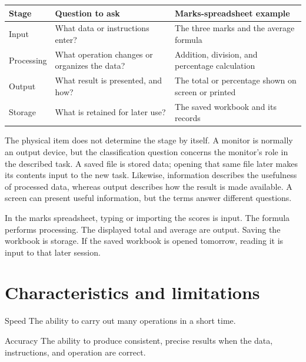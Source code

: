 \begin{center}
\begin{tabular}{p{}p{}p{}}
\toprule
\textbf{Stage} & \textbf{Question to ask} & \textbf{Marks-spreadsheet example}\\
\midrule
Input & What data or instructions enter? & The three marks and the average formula\\
Processing & What operation changes or organizes the data? & Addition, division, and percentage calculation\\
Output & What result is presented, and how? & The total or percentage shown on screen or printed\\
Storage & What is retained for later use? & The saved workbook and its records\\
\bottomrule
\end{tabular}
\end{center}

The physical item does not determine the stage by itself. A monitor is
normally an output device, but the classification question concerns the
monitor's role in the described task. A saved file is stored data; opening
that same file later makes its contents input to the new task. Likewise,
information describes the usefulness of processed data, whereas output
describes how the result is made available. A screen can present useful
information, but the terms answer different questions.

\begin{example}
In the marks spreadsheet, typing or importing the scores is input. The
formula performs processing. The displayed total and average are output.
Saving the workbook is storage. If the saved workbook is opened tomorrow,
reading it is input to that later session.
\end{example}

\section{Characteristics and limitations}
\begin{definitionbox}{Speed}
The ability to carry out many operations in a short time.
\end{definitionbox}

\begin{definitionbox}{Accuracy}
The ability to produce consistent, precise results when the data, instructions,
and operation are correct.
\end{definitionbox}

